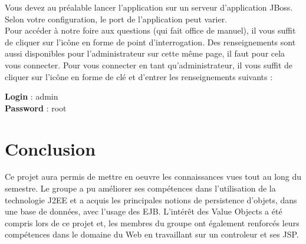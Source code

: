 \documentclass[10pt]{report}
\begin{document}
Vous devez au préalable lancer l'application sur un serveur d'application JBoss.
Selon votre configuration, le port de l'application peut varier.
\\

Pour accéder à notre foire aux questions (qui fait office de manuel), il vous suffit de cliquer sur l'icône en forme de point d'interrogation.
Des renseignements sont aussi disponibles pour l'administrateur sur cette même page, il faut pour cela vous connecter.
Pour vous connecter en tant qu'administrateur, il vous suffit de cliquer sur l'icône en forme de clé et d'entrer les renseignements suivants :
\begin{center}
\textbf{Login} : admin
\\
\textbf{Password} : root 
\end{center}

\chapter*{Conclusion}

Ce projet aura permis de mettre en oeuvre les connaissances vues tout au long du semestre. Le groupe a pu améliorer ses compétences dans l'utilisation de la technologie J2EE et a acquis les principales notions de persistence d'objets, dans une base de données, avec l'usage des EJB. L'intérêt des Value Objects a été compris lors de ce projet et, les membres du groupe ont également renforcés leurs compétences dans le domaine du Web en travaillant sur un controleur et ses JSP. 
\end{document}
